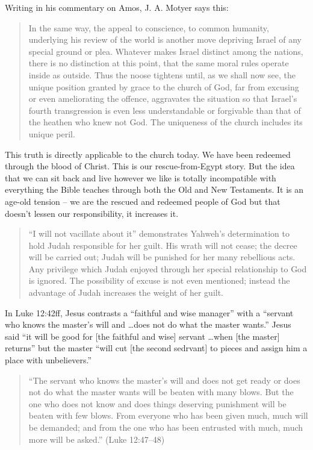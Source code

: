 Writing in his commentary on Amos, J. A. Motyer says this:

\begin{quote}
    In the same way, the appeal to conscience, to common humanity, underlying
    his review of the world is another move depriving Israel of any special
    ground or plea. Whatever makes Israel distinct among the nations, there is
    no distinction at this point, that the same moral rules operate inside as
    outside. Thus the noose tightens until, as we shall now see, the unique
    position granted by grace to the church of God, far from excusing or even
    ameliorating the offence, aggravates the situation so that Israel's fourth
    transgression is even less understandable or forgivable than that of the
    heathen who knew not God. The uniqueness of the church includes its unique
    peril.
    \autocite[50-51]{motyer:2011}
\end{quote}

This truth is directly applicable to the church today. We have been redeemed
through the blood of Christ. This is our rescue-from-Egypt story. But the idea
that we can sit back and live however we like is totally incompatible with
everything the Bible teaches through both the Old and New Testaments. It is an
age-old tension -- we are the rescued and redeemed people of God but that
doesn't lessen our responsibility, it increases it.

\begin{quote}
    \enquote{I will not vacillate about it} demonstrates Yahweh's determination
    to hold Judah responsible for her guilt. His wrath will not cease; the
    decree will be carried out; Judah will be punished for her many rebellious
    acts. Any privilege which Judah enjoyed through her special relationship to
    God is ignored. The possibility of excuse is not even mentioned; instead the
    advantage of Judah increases the weight of her guilt.
    \autocite[114-115]{smith:2017}
\end{quote}

In Luke 12:42ff, Jesus contrasts a \enquote{faithful and wise manager} with a
\enquote{servant who knows the master's will and \dots does not do what the
master wants.} Jesus said \enquote{it will be good for [the faithful and wise]
servant \dots when [the master] returns} but the master \enquote{will cut [the
second sedrvant] to pieces and assign him a place with unbelievers.}

\begin{quote}
    \enquote{The servant who knows the master's will and does not get ready or
    does not do what the master wants will be beaten with many blows. But the
    one who does not know and does things deserving punishment will be beaten
    with few blows. From everyone who has been given much, much will be
    demanded; and from the one who has been entrusted with much, much more will
    be asked.} (Luke 12:47--48)
\end{quote}

